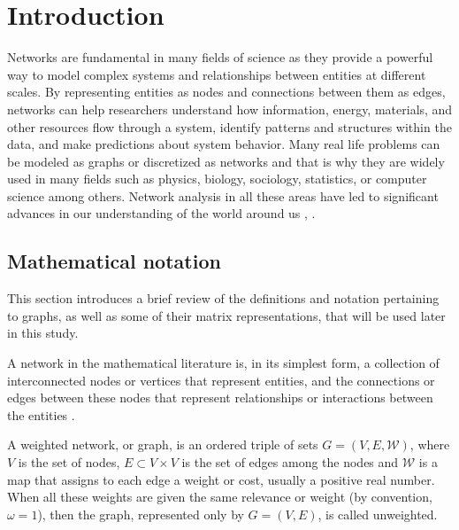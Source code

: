 
\chapter[Introduction]{Introduction}
\label{chap:intro}

Networks are fundamental in many fields of science as they provide a powerful way to model complex systems and relationships between entities at different scales. By representing entities as nodes and connections between them as edges, networks can help researchers understand how information, energy, materials, and other resources flow through a system, identify patterns and structures within the data, and make predictions about system behavior. Many real life problems can be modeled as graphs or discretized as networks and that is why they are widely used in many fields such as physics, biology, sociology, statistics, or computer science among others. Network analysis in all these areas have led to significant advances in our understanding of the world around us \cite{albert2002statistical, katz1953new}, \cite[Part I]{newman2018networks}.

\section{Mathematical notation}
\label{sec:graph}
This section introduces a brief review of the definitions and notation pertaining to graphs, as well as some of their matrix representations, that will be used later in this study.

A network in the mathematical literature is, in its simplest form, a collection of interconnected nodes or vertices that represent entities, and the connections or edges between these nodes that represent relationships or interactions between the entities \cite{arrigo2022dynamic}.

\begin{definition}
    A weighted network, or graph, is an ordered triple of sets $G = (V, E, \mathcal{W})$, where $V$ is the set of nodes, $E\subset V\times V$ is the set of edges among the nodes and $\mathcal{W}$ is a map that assigns to each edge a weight or cost, usually a positive real number. When all these weights are given the same relevance or weight (by convention, $\omega=1$), then the graph, represented only by $G = (V, E)$, is called unweighted.
\end{definition}

